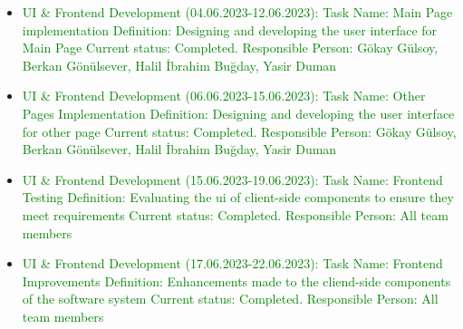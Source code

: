 \documentclass[conference]{IEEEtran}
\begin{document}
\begin{itemize}
       \item \textcolor{green} {UI & Frontend Development (04.06.2023-12.06.2023):\newline\newline
  Task Name: Main Page implementation\newline
  Definition: Designing and developing the user interface for Main Page\newline
  Current status: Completed.\newline 
  Responsible Person: Gökay Gülsoy, Berkan Gönülsever, Halil İbrahim Buğday, Yasir Duman\newline
}

  \item \textcolor{green} {UI & Frontend Development (06.06.2023-15.06.2023):\newline\newline
  Task Name: Other Pages Implementation\newline
  Definition: Designing and developing the user interface for other page\newline
  Current status: Completed.\newline 
  Responsible Person: Gökay Gülsoy, Berkan Gönülsever, Halil İbrahim Buğday, Yasir Duman\newline
}

  \item \textcolor{green} {UI & Frontend Development (15.06.2023-19.06.2023):\newline\newline
  Task Name: Frontend Testing\newline
  Definition: Evaluating the ui of client-side components to ensure they meet requirements\newline
  Current status: Completed.\newline 
  Responsible Person: All team members\newline
}


    \item \textcolor{green} {UI & Frontend Development (17.06.2023-22.06.2023):\newline\newline
  Task Name: Frontend Improvements\newline
  Definition:  Enhancements made to the cliend-side components of the software system\newline
  Current status: Completed.\newline 
  Responsible Person:  All team members\newline
}


\end{itemize}
\end{document}

